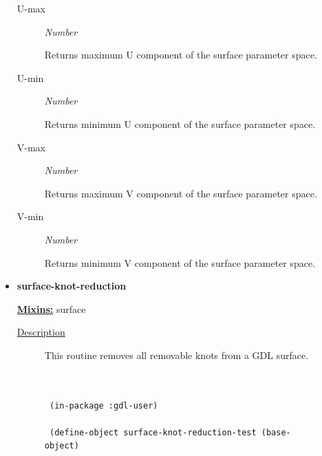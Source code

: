 \documentclass [11pt]{book}
\begin{document}
\begin{itemize}
\begin{description}
\item [U-max]
\emph{Number}

 Returns maximum U component of the surface parameter space.




\item [U-min]
\emph{Number}

 Returns minimum U component of the surface parameter space.




\item [V-max]
\emph{Number}

 Returns maximum V component of the surface parameter space.




\item [V-min]
\emph{Number}

 Returns minimum V component of the surface parameter space.




\end{description}







\item {}
\label{prim:surface-knot-reduction}
\textbf{surface-knot-reduction}


\textbf{
\underline{Mixins:}} surface





\begin{description}

\item [
\underline{Description}]


This routine  removes  all  removable  knots  from a GDL surface.



\end{description}




\begin{figure}
\begin{lrbox}{\boxedverb}
\begin{minipage}{\linewidth}
{\small

\begin{verbatim}

 
 (in-package :gdl-user)

 (define-object surface-knot-reduction-test (base-object) 


\end{verbatim}}
\end{minipage}
\end{lrbox}
\end{figure}
\end{itemize}
\end{document}
